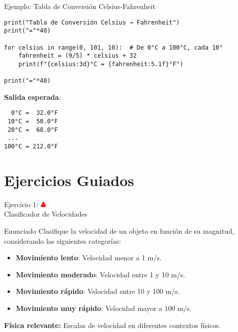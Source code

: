 \documentclass[10pt]{beamer}
\begin{document}
\begin{frame}[fragile]{Ejemplo: Tabla de Conversión Celsius-Fahrenheit}
\begin{verbatim}
print("Tabla de Conversión Celsius → Fahrenheit")
print("="*40)

for celsius in range(0, 101, 10):  # De 0°C a 100°C, cada 10°
    fahrenheit = (9/5) * celsius + 32
    print(f"{celsius:3d}°C = {fahrenheit:5.1f}°F")

print("="*40)
\end{verbatim}

\textbf{Salida esperada}:
\begin{verbatim}
  0°C =  32.0°F
 10°C =  50.0°F
 20°C =  68.0°F
 ...
100°C = 212.0°F
\end{verbatim}
\end{frame}


\section{Ejercicios Guiados}

\begin{frame}{Ejercicio 1: \hfill \textcolor{red}{$\clubsuit$} \\ Clasificador de Velocidades}
  \begin{block}{Enunciado}
    Clasifique la velocidad de un objeto en función de su magnitud, considerando las siguientes categorías:
    \begin{itemize}
      \item \textbf{Movimiento lento}: Velocidad menor a 1 m/s.
      \item \textbf{Movimiento moderado}: Velocidad entre 1 y 10 m/s.
      \item \textbf{Movimiento rápido}: Velocidad entre 10 y 100 m/s.
      \item \textbf{Movimiento muy rápido}: Velocidad mayor a 100 m/s.
    \end{itemize}
    \textbf{Física relevante:} Escalas de velocidad en diferentes contextos físicos.
  \end{block}
\end{frame}
\end{document}
